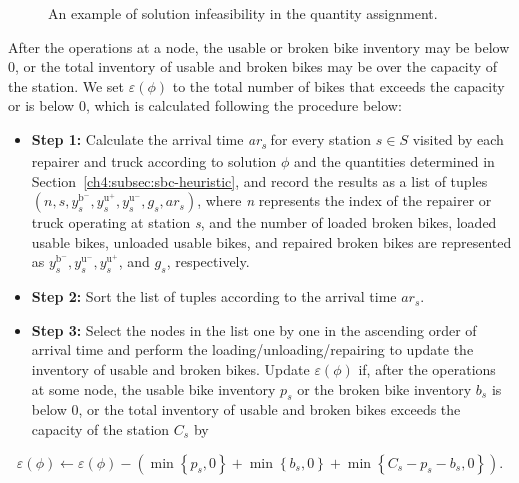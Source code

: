 \begin{figure}[htbp]
\centering
{}
\caption{An example of solution infeasibility in the quantity assignment.}
\label{ch4:fig:quantity-infeasibility}
\end{figure}

After the operations at a node, the usable or broken bike inventory may be below 0, or the total
inventory of usable and broken bikes may be over the capacity of the station. We set
\(\varepsilon(\phi)\) to the total number of bikes that exceeds the capacity or is below 0, which is
calculated following the procedure below:

\begin{itemize}
\item
  \textbf{Step 1:} Calculate the arrival time \emph{ar\textsubscript{s}} for every station
  \(s \in S\) visited by each repairer and truck according to solution \(\phi\) and the quantities
  determined in Section~\ref{ch4:subsec:sbc-heuristic}, and record the results as a list of tuples
  \(\left( {n,s,y_{s}^{\text{b}^{-}},y_{s}^{\text{u}^{+}},y_{s}^{\text{u}^{-}},g_{s},ar_{s}} \right)\),
  where \emph{n} represents the index of the repairer or truck operating at station \emph{s}, and
  the number of loaded broken bikes, loaded usable bikes, unloaded usable bikes, and repaired broken
  bikes are represented as \(y_{s}^{\text{b}^{-}},y_{s}^{\text{u}^{-}},y_{s}^{\text{u}^{+}}\), and
  \(g_{s}\), respectively.
\item
  \textbf{Step 2:} Sort the list of tuples according to the arrival time \(ar_{s}\).
\item
  \textbf{Step 3:} Select the nodes in the list one by one in the ascending order of arrival time
  and perform the loading/unloading/repairing to update the inventory of usable and broken bikes.
  Update \(\varepsilon(\phi)\) if, after the operations at some node, the usable bike inventory
  \(p_{s}\) or the broken bike inventory \(b_{s}\) is below 0, or the total inventory of usable and
  broken bikes exceeds the capacity of the station \(C_{s}\) by
\end{itemize}

\begin{equation}
\left.
\varepsilon(\phi)\leftarrow\varepsilon(\phi)
- \left( {\min\left\{ {p_{s},0} \right\} + \min\left\{ {b_{s},0} \right\}
+ \min\left\{ {C_{s} - p_{s} - b_{s},0} \right\}} \right).
\right.
\end{equation}

